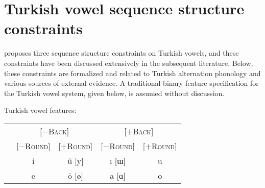 \section{Turkish vowel sequence structure constraints}

\citet{Lees1966a,Lees1966b} proposes three sequence structure constraints on Turkish vowels, and these constraints have been discussed extensively in the subsequent literature. Below, these constraints are formalized and related to Turkish alternation phonology and various sources of external evidence. A traditional binary feature specification for the Turkish vowel system, given below, is assumed without discussion.

\begin{example}
Turkish vowel features: 

\vspace{0.5\baselineskip}
\begin{tabular}{c | c c c c}
                       & \multicolumn{2}{c}{[$-$\textsc{Back}]} & \multicolumn{2}{c}{[$+$\textsc{Back}]} \\
                       & [$-$\textsc{Round}] & [$+$\textsc{Round}] & [$-$\textsc{Round}] & [$+$\textsc{Round}] \\ \midrule
{} & i & ü [y] & ı [ɯ] & u \\
 & e & ö [ø] & a [ɑ] & o \\
\end{tabular}
\end{example}




